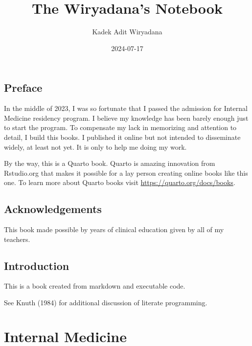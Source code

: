 \documentclass[
  letterpaper,
  DIV=11,
  numbers=noendperiod]{scrreprt}
\title{The Wiryadana's Notebook}
\author{Kadek Adit Wiryadana}
\date{2024-07-17}
\renewcommand*\contentsname{Table of contents}
\newcommand\contentsname{Table of contents}
\begin{document}
\maketitle

\renewcommand*\contentsname{Table of contents}
{
\hypersetup{linkcolor=}
\setcounter{tocdepth}{2}
\tableofcontents
}

\chapter*{Preface}\label{preface}


In the middle of 2023, I was so fortunate that I passed the admission
for Internal Medicine residency program. I believe my knowledge has been
barely enough just to start the program. To compensate my lack in
memorizing and attention to detail, I build this books. I published it
online but not intended to disseminate widely, at least not yet. It is
only to help me doing my work.

By the way, this is a Quarto book. Quarto is amazing innovation from
Rstudio.org that makes it possible for a lay person creating online
books like this one. To learn more about Quarto books visit
\url{https://quarto.org/docs/books}.


\chapter*{Acknowledgements}\label{acknowledgements}


This book made possible by years of clinical education given by all of
my teachers.


\chapter{Introduction}\label{introduction}

This is a book created from markdown and executable code.

See Knuth (1984) for additional discussion of literate programming.

\part{Internal Medicine}
\end{document}
